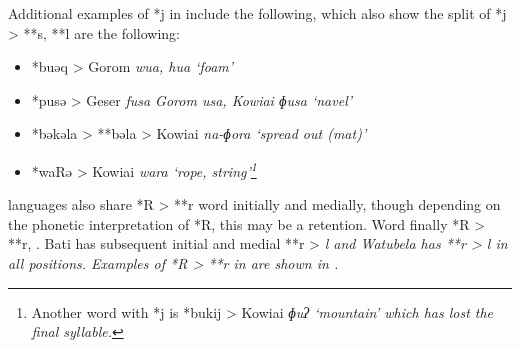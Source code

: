 Additional examples of *j in  include the following,
which also show the split of *j > **s, **l are the following:

\begin{itemize}
	\item *buəq > Gorom \it{wua}, \it{hua} ‘foam’
	\item	*pusə > Geser \it{fusa}
				Gorom \it{usa}, Kowiai \it{ɸusa} ‘navel’
	\item	*bəkəla > **bəla > Kowiai
				\it{na-ɸora} ‘spread out (mat)’
	\item	*waRə > Kowiai \it{wara} ‘rope,
				string’\footnote{
						Another word with *j is *bukij > Kowiai
						\it{ɸuʔ} ‘mountain’ which has lost the final syllable.}
\end{itemize}

 languages also share *R > **r word initially
and medially, though depending on the phonetic interpretation
of *R, this may be a retention.
Word finally *R > **r, {\0}.
Bati has subsequent initial
and medial **r > \it{l}
and Watubela has **r > \it{l} in all positions.
Examples of *R > **r in  are shown in .

